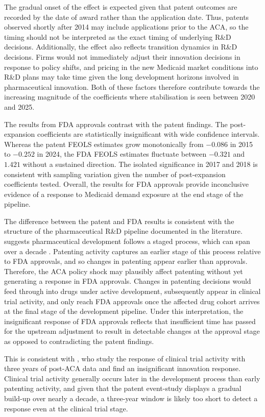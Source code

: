 \documentclass[12pt]{article}
\begin{document}
The gradual onset of the effect is expected given that patent outcomes are recorded by the date of award rather than the application date. Thus, patents observed shortly after 2014 may include applications prior to the ACA, so the timing should not be interpreted as the exact timing of underlying R\&D decisions. Additionally, the effect also reflects transition dynamics in R\&D decisions. Firms would not immediately adjust their innovation decisions in response to policy shifts, and pricing in the new Medicaid market conditions into R\&D plans may take time given the long development horizons involved in pharmaceutical innovation. Both of these factors therefore contribute towards the increasing magnitude of the coefficients where stabilisation is seen between 2020 and 2025.

The results from FDA approvals contrast with the patent findings. The post-expansion coefficients are statistically insignificant with wide confidence intervals. Whereas the patent FEOLS estimates grow monotonically from $-0.086$ in 2015 to $-0.252$ in 2024, the FDA FEOLS estimates fluctuate between $-0.321$ and $1.421$ without a sustained direction. The isolated significance in 2017 and 2018 is consistent with sampling variation given the number of post-expansion coefficients tested. Overall, the results for FDA approvals provide inconclusive evidence of a response to Medicaid demand exposure at the end stage of the pipeline.

The difference between the patent and FDA results is consistent with the structure of the pharmaceutical R\&D pipeline documented in the literature. \citet{sutton1998technology} suggests pharmaceutical development follows a staged process, which can span over a decade \citep{brown2022clinical}. Patenting activity captures an earlier stage of this process relative to FDA approvals, and so changes in patenting appear earlier than approvals. Therefore, the ACA policy shock may plausibly affect patenting without yet generating a response in FDA approvals. Changes in patenting decisions would feed through into drugs under active development, subsequently appear in clinical trial activity, and only reach FDA approvals once the affected drug cohort arrives at the final stage of the development pipeline. Under this interpretation, the insignificant response of FDA approvals reflects that insufficient time has passed for the upstream adjustment to result in detectable changes at the approval stage as opposed to contradicting the patent findings.

This is consistent with \citet{NBERw28755}, who study the response of clinical trial activity with three years of post-ACA data and find an insignificant innovation response. Clinical trial activity generally occurs later in the development process than early patenting activity, and given that the patent event-study displays a gradual build-up over nearly a decade, a three-year window is likely too short to detect a response even at the clinical trial stage.
\end{document}
